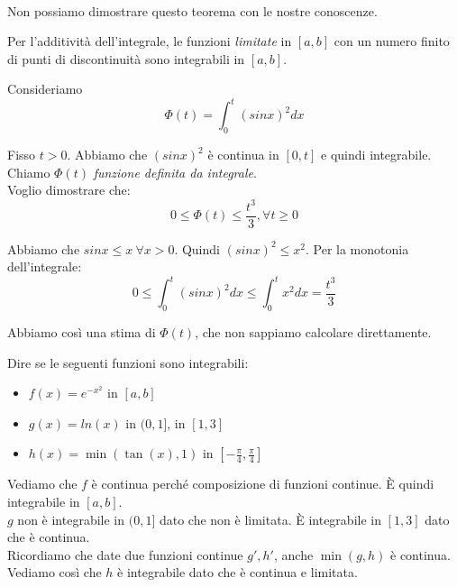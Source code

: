 \leavevmode \\
Non possiamo dimostrare questo teorema con le nostre conoscenze. \\

\begin{teorema}
    Per l'additività dell'integrale, le funzioni \textit{limitate} in $[a,b]$ con un numero finito di punti di discontinuità sono integrabili in $[a,b]$.
\end{teorema}

\begin{esercizio}
    Consideriamo
    \begin{equation}
        \Phi(t)=\int_{0}^{t} (sinx)^2 dx
    \end{equation}

    Fisso $t>0$. Abbiamo che $(sinx)^2$ è continua in $[0,t]$ e quindi integrabile. \\
    Chiamo $\Phi(t)$ \textit{funzione definita da integrale}. \\
    Voglio dimostrare che:
    \begin{equation}
        0 \leq \Phi(t) \leq \frac{t^3}{3}, \forall t \geq 0
    \end{equation}

    Abbiamo che $sinx\leq x\ \forall x > 0$. Quindi $(sinx)^2 \leq x^2$. Per la monotonia dell'integrale:
    \begin{equation}
        0 \leq \int_{0}^{t} (sinx)^2 dx \leq \int_{0}^{t} x^2 dx = \frac{t^3}{3}
    \end{equation}

    Abbiamo così una stima di $\Phi(t)$, che non sappiamo calcolare direttamente.
\end{esercizio}

\begin{esercizio}
    Dire se le seguenti funzioni sono integrabili:
    \begin{itemize}
        \item $f(x)=e^{-x^2}$ in $[a,b]$
        \item $g(x)=ln(x)$ in $(0,1]$, in $[1,3]$
        \item $h(x)=\min(\tan(x), 1)$ in $[ -\frac{\pi}{4}, \frac{\pi}{4}]$
    \end{itemize}

    Vediamo che $f$ è continua perché composizione di funzioni continue. È quindi integrabile in $[a,b]$. \\
    $g$ non è integrabile in $(0,1]$ dato che non è limitata. È integrabile in $[1,3]$ dato che è continua. \\
    Ricordiamo che date due funzioni continue $g', h'$, anche $\min(g, h)$ è continua. Vediamo così che $h$ è integrabile dato che è continua e limitata.
\end{esercizio}


